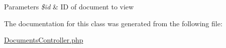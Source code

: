 \begin{DoxyParams}{\-Parameters}
{\em \$id} & \-I\-D of document to view \\
\hline
\end{DoxyParams}


\-The documentation for this class was generated from the following file\-:\begin{DoxyCompactItemize}
\item 
\hyperlink{DocumentsController_8php}{\-Documents\-Controller.\-php}\end{DoxyCompactItemize}

